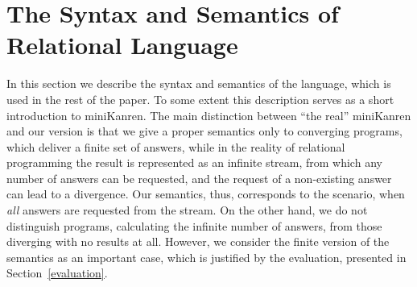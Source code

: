 \section{The Syntax and Semantics of Relational Language}
\label{language}

In this section we describe the syntax and semantics of the language, which is used in the rest of the paper. To some extent this description serves as
a short introduction to miniKanren. The main distinction between ``the real'' miniKanren and our version is that we give a proper semantics only to converging programs, 
which deliver a finite set of answers, while in the reality of relational programming the result is represented as an infinite stream, from which any number of answers can be requested, and the request of a non-existing answer can
lead to a divergence. Our semantics, thus, corresponds to the scenario, when \emph{all} answers are requested from the stream. On the other hand, we do not distinguish programs, calculating the infinite number 
of answers, from those diverging with no results at all.   
However, we consider the finite version of the semantics as an important case, which is justified by the evaluation, presented in Section~\ref{evaluation}.


